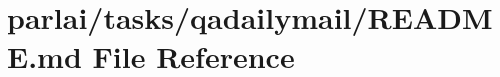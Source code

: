 \hypertarget{parlai_2tasks_2qadailymail_2README_8md}{}\section{parlai/tasks/qadailymail/\+R\+E\+A\+D\+ME.md File Reference}
\label{parlai_2tasks_2qadailymail_2README_8md}
